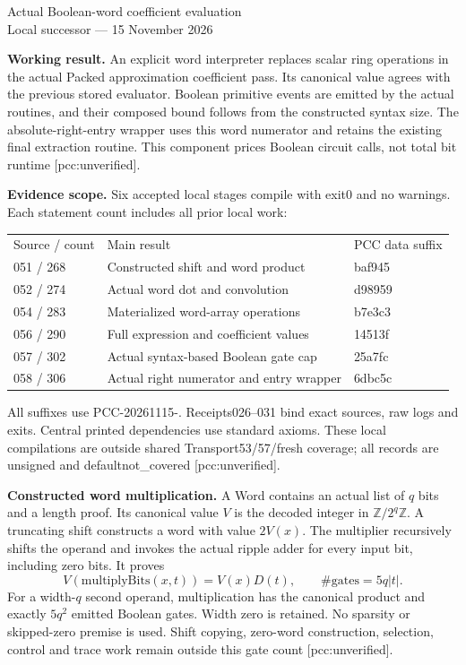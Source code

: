 \documentclass[10pt]{article}
\begin{document}
\begin{center}{\Large Actual Boolean-word coefficient evaluation}\\[4pt]
Local successor --- 15 November 2026\end{center}
\textbf{Working result.} An explicit word interpreter replaces scalar ring
operations in the actual Packed approximation coefficient pass. Its canonical
value agrees with the previous stored evaluator. Boolean primitive events are
emitted by the actual routines, and their composed bound follows from the
constructed syntax size. The absolute-right-entry wrapper uses this word
numerator and retains the existing final extraction routine. This component
prices Boolean circuit calls, not total bit runtime [pcc:unverified].

\textbf{Evidence scope.} Six accepted local stages compile with exit0 and no
warnings. Each statement count includes all prior local work:
\begin{center}
\begin{tabular}{lll}
Source / count & Main result & PCC data suffix\\
051 / 268 & Constructed shift and word product & baf945\\
052 / 274 & Actual word dot and convolution & d98959\\
054 / 283 & Materialized word-array operations & b7e3c3\\
056 / 290 & Full expression and coefficient values & 14513f\\
057 / 302 & Actual syntax-based Boolean gate cap & 25a7fc\\
058 / 306 & Actual right numerator and entry wrapper & 6dbc5c
\end{tabular}
\end{center}
All suffixes use PCC-20261115-. Receipts026--031 bind exact sources, raw logs
and exits. Central printed dependencies use standard axioms. These local
compilations are outside shared Transport53/57/fresh coverage; all records are
unsigned and defaultnot\_covered [pcc:unverified].

\textbf{Constructed word multiplication.} A Word contains an actual list of
$q$ bits and a length proof. Its canonical value $V$ is the decoded integer in
$\mathbb Z/2^q\mathbb Z$. A truncating shift constructs a word with value $2V(x)$.
The multiplier recursively shifts the operand and invokes the actual ripple
adder for every input bit, including zero bits. It proves
\[
 V(\mathrm{multiplyBits}(x,t))=V(x)D(t),\qquad
 \#\mathrm{gates}=5q|t|.
\]
For a width-$q$ second operand, multiplication has the canonical product and
exactly $5q^2$ emitted Boolean gates. Width zero is retained. No sparsity or
skipped-zero premise is used. Shift copying, zero-word construction, selection,
control and trace work remain outside this gate count [pcc:unverified].
\end{document}
